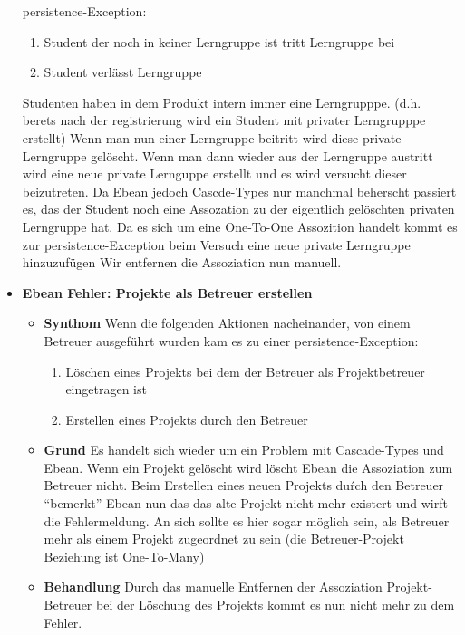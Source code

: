 \documentclass[parskip=full]{scrartcl}
\newcommand{\fehler}[4]{\textbf{#1}
 							\begin{itemize}
 							  \item \textbf{Synthom}  #2
 							  \item \textbf{Grund} #3
 							  \item \textbf{Behandlung} #4
 							\end{itemize}}
\begin{document}
\begin{itemize}
{persistence-Exception:\begin{enumerate}
  \item Student der noch in keiner Lerngruppe ist tritt Lerngruppe bei
  \item Student verlässt Lerngruppe
\end{enumerate}}{Studenten haben in dem Produkt intern immer eine Lerngrupppe.
(d.h.
berets nach der registrierung wird ein Student mit privater Lerngrupppe
erstellt) Wenn man nun einer Lerngruppe beitritt wird diese private Lerngruppe
gelöscht. Wenn man dann wieder aus der Lerngruppe austritt wird eine neue
private Lernguppe erstellt und es wird versucht dieser beizutreten. Da Ebean
jedoch Cascde-Types nur manchmal beherscht passiert es, das der Student noch
eine Assozation zu der eigentlich gelöschten privaten Lerngruppe hat. Da es sich
um eine One-To-One Assozition handelt kommt es zur persistence-Exception beim
Versuch eine neue private Lerngruppe hinzuzufügen }{Wir entfernen die
Assoziation nun manuell.}
\item \fehler{Ebean Fehler: Projekte als Betreuer erstellen}{Wenn die folgenden
Aktionen nacheinander, von einem Betreuer ausgeführt wurden kam es zu einer
persistence-Exception:
\begin{enumerate}
  \item Löschen eines Projekts bei dem der Betreuer als Projektbetreuer
  eingetragen ist
  \item Erstellen eines Projekts durch den Betreuer
\end{enumerate}}{Es handelt sich wieder um ein Problem mit Cascade-Types und
Ebean. Wenn ein Projekt gelöscht wird löscht Ebean die Assoziation zum
Betreuer nicht. Beim Erstellen eines neuen Projekts duŕch den Betreuer
\enquote{bemerkt} Ebean nun das das alte Projekt nicht mehr existert und wirft
die Fehlermeldung. An sich sollte es hier sogar möglich sein, als Betreuer mehr
als einem Projekt zugeordnet zu sein (die Betreuer-Projekt Beziehung ist
One-To-Many) }{Durch das manuelle Entfernen der Assoziation Projekt-Betreuer
bei der Löschung des Projekts kommt es nun nicht mehr zu dem Fehler. }
\end{itemize}
\end{document}
